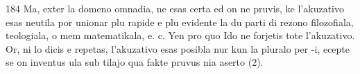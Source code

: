 \begin{VUpage}[188]{184}
Ma, exter la domeno omnadia, ne esas certa ed on ne\nl
pruvis, ke l'akuzativo esas neutila por unionar plu rapide\nl
e plu evidente la du parti di rezono filozofiala, teologiala,\nl
o mem matematikala, e. c. Yen pro quo Ido ne forjetis tote\nl
l'akuzativo. Or, ni lo dicis e repetas, l'akuzativo esas posibla\nl
nur kun la pluralo per -i, ecepte se on inventus ula sub\cc
tilajo qua fakte pruvus nia aserto (2).
\end{VUpage}

